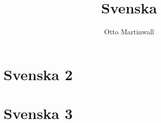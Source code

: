 

\title{Svenska}
\author{Otto Martinwall}


\maketitle
\tableofcontents
\newpage

\newtheorem{definition}{Definition}
\newtheorem{theorem}{Theorem}

\section{Svenska 2}


\section{Svenska 3}



